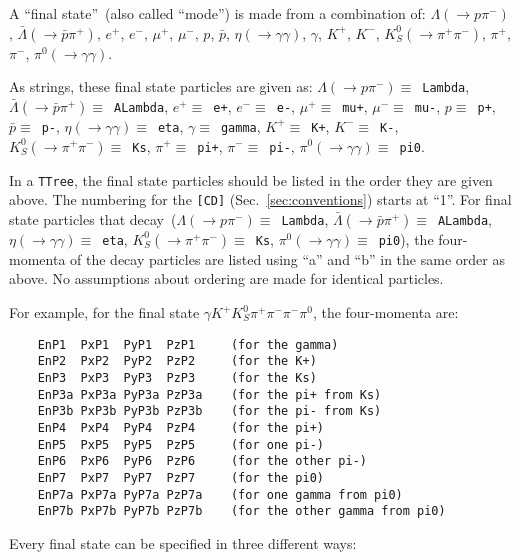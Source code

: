\documentclass[11pt]{article}
\begin{document}
A ``final state''~(also called ``mode'') is made from a combination of: $\Lambda (\to p \pi^-)$, $\bar{\Lambda} (\to \bar{p} \pi^+)$, $e^+$, $e^-$, $\mu^+$, $\mu^-$, $p$, $\bar{p}$, $\eta (\to \gamma\gamma)$, $\gamma$, $K^+$, $K^-$, $K^0_S (\to \pi^+\pi^-)$, $\pi^+$, $\pi^-$, $\pi^0 (\to \gamma\gamma)$.

As strings, these final state particles are given as:
$\Lambda (\to p \pi^-) \equiv $~{\tt Lambda}, 
$\bar{\Lambda} (\to \bar{p} \pi^+) \equiv $~{\tt ALambda}, 
$e^+ \equiv $~{\tt e+}, 
$e^- \equiv $~{\tt e-}, 
$\mu^+ \equiv $~{\tt mu+},  
$\mu^- \equiv $~{\tt mu-}, 
$p \equiv $~{\tt p+}, 
$\bar{p} \equiv $~{\tt p-}, 
$\eta (\to \gamma\gamma) \equiv $~{\tt eta}, 
$\gamma \equiv $~{\tt gamma}, 
$K^+ \equiv $~{\tt K+}, 
$K^- \equiv $~{\tt K-}, 
$K^0_S (\to \pi^+\pi^-) \equiv $~{\tt Ks}, 
$\pi^+ \equiv $~{\tt pi+}, 
$\pi^- \equiv $~{\tt pi-}, 
$\pi^0 (\to \gamma\gamma) \equiv $~{\tt pi0}.

In a {\tt TTree}, the final state particles should be listed in the order they are given above.  The numbering for the {\tt [CD]} (Sec.~\ref{sec:conventions}) starts at ``1''.  For final state particles that decay~($\Lambda (\to p \pi^-) \equiv $~{\tt Lambda}, 
$\bar{\Lambda} (\to \bar{p} \pi^+) \equiv $~{\tt ALambda}, $\eta (\to \gamma\gamma) \equiv $~{\tt eta}, $K^0_S (\to \pi^+\pi^-) \equiv $~{\tt Ks}, $\pi^0 (\to \gamma\gamma) \equiv $~{\tt pi0}), the four-momenta of the decay particles are listed using ``a'' and ``b'' in the same order as above.  No assumptions about ordering are made for identical particles.

For example, for the final state $\gamma K^+ K^0_S \pi^+ \pi^- \pi^- \pi^0$, the four-momenta are:
\begin{verbatim}
    EnP1  PxP1  PyP1  PzP1     (for the gamma)
    EnP2  PxP2  PyP2  PzP2     (for the K+)
    EnP3  PxP3  PyP3  PzP3     (for the Ks)
    EnP3a PxP3a PyP3a PzP3a    (for the pi+ from Ks)
    EnP3b PxP3b PyP3b PzP3b    (for the pi- from Ks)
    EnP4  PxP4  PyP4  PzP4     (for the pi+)
    EnP5  PxP5  PyP5  PzP5     (for one pi-)
    EnP6  PxP6  PyP6  PzP6     (for the other pi-)
    EnP7  PxP7  PyP7  PzP7     (for the pi0)
    EnP7a PxP7a PyP7a PzP7a    (for one gamma from pi0)
    EnP7b PxP7b PyP7b PzP7b    (for the other gamma from pi0)
\end{verbatim}





Every final state can be specified in three different ways:
\end{document}
